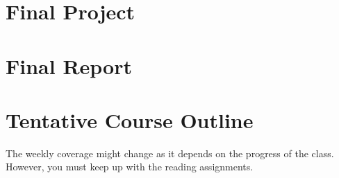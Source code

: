 \documentclass[11pt]{article}
\begin{document}
\section{Final Project}
\section{Final Report}

\newpage

\section{Tentative Course Outline}

The weekly coverage might change as it depends on the progress of the class.  However, you must keep up with the reading assignments.
\end{document}
